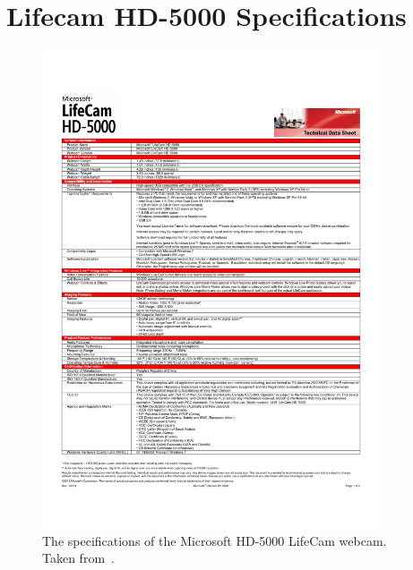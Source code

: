 \chapter{Lifecam HD-5000 Specifications}

\begin{figure}
  \centering
  \includegraphics[width=0.89\textwidth, clip, trim = 0 120 0 60]{figures/appendices/lifecam_specs}
  \caption[The specifications of the Microsoft HD-5000 LifeCam webcam.]{The specifications of the Microsoft HD-5000 LifeCam webcam. Taken from~\cite{webcam-specs-pic}.}
\end{figure}

\endinput
